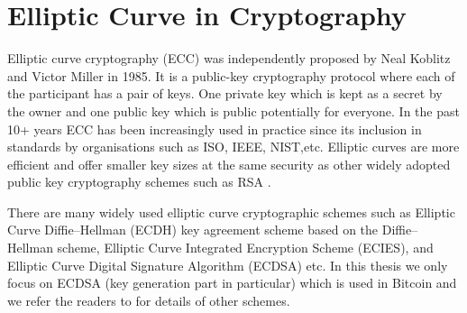 

\section{Elliptic Curve in Cryptography}
Elliptic curve cryptography (ECC) was independently proposed by Neal Koblitz\cite{koblitz1987elliptic} and Victor Miller \cite{miller1985use} in 1985. It is a public-key cryptography protocol where each of the participant has a pair of keys. One private key which is kept as a secret by the owner and one public key which is public potentially for everyone. In the past 10+ years ECC has been increasingly used in practice since its inclusion in standards by organisations such as ISO, IEEE, NIST,etc. Elliptic curves are more efficient \cite{bernstein2009ebacs} and offer smaller key sizes \cite{lenstra2001selecting} at the same security as other widely adopted public key cryptography schemes such as RSA \cite{rivest1978method}. 

There are many widely used elliptic curve cryptographic schemes such as Elliptic Curve Diffie–Hellman (ECDH) key agreement scheme based on the Diffie–Hellman scheme, Elliptic Curve Integrated Encryption Scheme (ECIES), and Elliptic Curve Digital Signature Algorithm (ECDSA) etc. In this thesis we only focus on ECDSA \cite{johnson2001elliptic} (key generation part in particular) which is used in Bitcoin and we refer the readers to \cite{hankerson2006guide} for details of other schemes.

